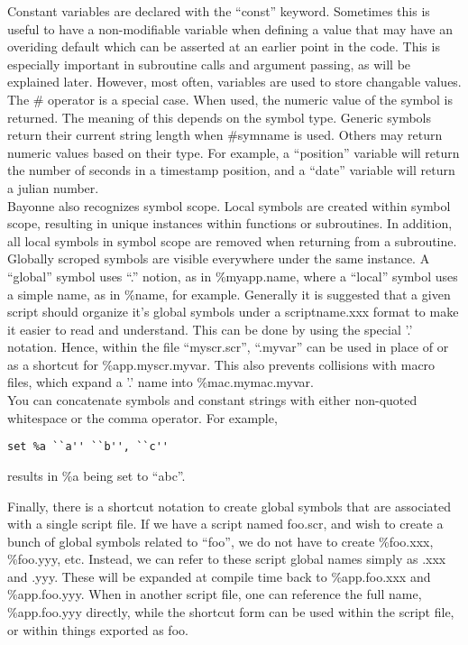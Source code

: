 \documentclass[a4paper,12pt]{article}
\begin{document}
Constant variables are declared with the ``const'' keyword.  Sometimes
this is useful to have a non-modifiable variable when defining a value
that may have an overiding default which can be asserted at an earlier
point in the code.  This is especially important in subroutine calls and 
argument passing, as will be explained later.  However, most often, 
variables are used to store changable values. \\

The \# operator is a special case.  When used, the numeric value of the
symbol is returned.  The meaning of this depends on the symbol type. 
Generic symbols return their current string length when \#symname is
used.  Others may return numeric values based on their type.  For
example, a ``position'' variable will return the number of seconds in a
timestamp position, and a ``date'' variable will return a julian number. \\

Bayonne also recognizes symbol scope.  Local symbols are created within
symbol scope, resulting in unique instances within functions or
subroutines. In addition, all local symbols in symbol scope are removed
when returning from a subroutine.  Globally scroped symbols are visible
everywhere under the same instance.  A ``global'' symbol uses ``.''
notion, as in \%myapp.name, where a ``local'' symbol uses a simple name,
as in \%name, for example.  Generally it is suggested that a given
script should organize it's global symbols under a scriptname.xxx format
to make it easier to read and understand.  This can be done by using the
special '.' notation.  Hence, within the file ``myscr.scr'', ``.myvar''
can be used in place of or as a shortcut for \%app.myscr.myvar.  This
also prevents collisions with macro files, which expand a '.' name into
\%mac.mymac.myvar. \\

You can concatenate symbols and constant strings with either
non-quoted whitespace or the comma operator.  For example, \\

\begin{verbatim}
set %a ``a'' ``b'', ``c''
\end{verbatim}

results in \%a being set to ``abc''. 

Finally, there is a shortcut notation to create global symbols that are 
associated with a single script file.  If we have a script named foo.scr, 
and wish to create a bunch of global symbols related to ``foo'', we do not 
have to create \%foo.xxx, \%foo.yyy, etc.  Instead, we can refer to these 
script global names simply as .xxx and .yyy.  These will be expanded at 
compile time back to \%app.foo.xxx and \%app.foo.yyy.  When in another script 
file, one can reference the full name, \%app.foo.yyy directly, while the 
shortcut form can be used within the script file, or within things 
exported as foo. \\
\end{document}
